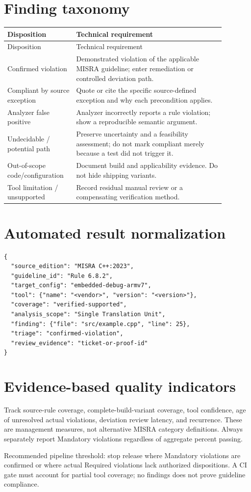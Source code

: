 \documentclass[10pt,letterpaper]{article}
\begin{document}
\section{Finding taxonomy}
\small\setlength{\tabcolsep}{3pt}\renewcommand{\arraystretch}{1.15}
\begin{longtable}{p{0.26\linewidth}p{0.62\linewidth}}
\toprule
Disposition & Technical requirement\\ \midrule
\endfirsthead
\toprule
Disposition & Technical requirement\\ \midrule
\endhead
Confirmed violation & Demonstrated violation of the applicable MISRA guideline; enter remediation or controlled deviation path.\\
Compliant by source exception & Quote or cite the specific source-defined exception and why each precondition applies.\\
Analyzer false positive & Analyzer incorrectly reports a rule violation; show a reproducible semantic argument.\\
Undecidable / potential path & Preserve uncertainty and a feasibility assessment; do not mark compliant merely because a test did not trigger it.\\
Out-of-scope code/configuration & Document build and applicability evidence. Do not hide shipping variants.\\
Tool limitation / unsupported & Record residual manual review or a compensating verification method.\\
\bottomrule
\end{longtable}
\normalsize

\section{Automated result normalization}
\begin{lstlisting}[language={},caption={Proposed analysis-record schema (illustrative JSON)}]
{
  "source_edition": "MISRA C++:2023",
  "guideline_id": "Rule 6.8.2",
  "target_config": "embedded-debug-armv7",
  "tool": {"name": "<vendor>", "version": "<version>"},
  "coverage": "verified-supported",
  "analysis_scope": "Single Translation Unit",
  "finding": {"file": "src/example.cpp", "line": 25},
  "triage": "confirmed-violation",
  "review_evidence": "ticket-or-proof-id"
}
\end{lstlisting}

\section{Evidence-based quality indicators}
Track source-rule coverage, complete-build-variant coverage, tool confidence, age of unresolved actual violations, deviation review latency, and recurrence. These are management measures, not alternative MISRA category definitions. Always separately report Mandatory violations regardless of aggregate percent passing.

Recommended pipeline threshold: stop release where Mandatory violations are confirmed or where actual Required violations lack authorized dispositions. A CI gate must account for partial tool coverage; no findings does not prove guideline compliance.
\end{document}
